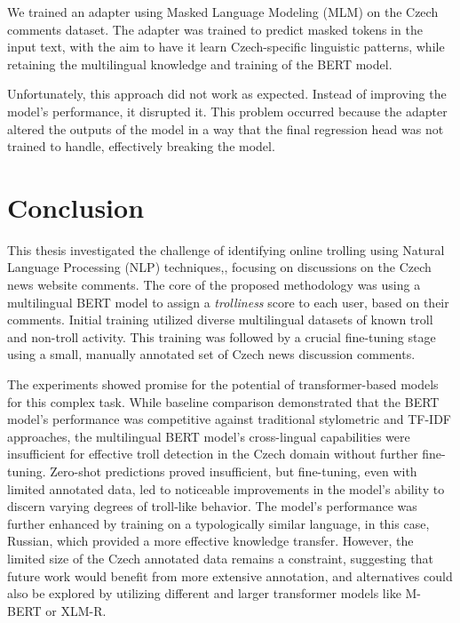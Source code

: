 \documentclass[twoside]{ctuthesis}
\theoremstyle{plain}
\theoremstyle{definition}
\theoremstyle{note}
\begin{document}
We trained an adapter using Masked Language Modeling (MLM) on the Czech comments dataset. The adapter was trained to predict masked tokens in the input text, with the aim to have it learn Czech-specific linguistic patterns, while retaining the multilingual knowledge and training of the BERT model.\par

Unfortunately, this approach did not work as expected. Instead of improving the model's performance, it disrupted it. This problem occurred because the adapter altered the outputs of the model in a way that the final regression head was not trained to handle, effectively breaking the model. \par
 
\chapter{Conclusion}

This thesis investigated the challenge of identifying online trolling using Natural Language Processing (NLP) techniques,, focusing on discussions on the Czech news website comments. The core of the proposed methodology was using a multilingual BERT model to assign a \textit{trolliness} score to each user, based on their comments. Initial training utilized diverse multilingual datasets of known troll and non-troll activity. This training was followed by a crucial fine-tuning stage using a small, manually annotated set of Czech news discussion comments.

The experiments showed promise for the potential of transformer-based models for this complex task. While baseline comparison demonstrated that the BERT model's performance was competitive against traditional stylometric and TF-IDF approaches, the multilingual BERT model's cross-lingual capabilities were insufficient for effective troll detection in the Czech domain without further fine-tuning. Zero-shot predictions proved insufficient, but fine-tuning, even with limited annotated data, led to noticeable improvements in the model's ability to discern varying degrees of troll-like behavior. The model's performance was further enhanced by training on a typologically similar language, in this case, Russian, which provided a more effective knowledge transfer. However, the limited size of the Czech annotated data remains a constraint, suggesting that future work would benefit from more extensive annotation, and alternatives could also be explored by utilizing different and larger transformer models like M-BERT or XLM-R.\par

\appendix

\printindex

 

\end{document}
